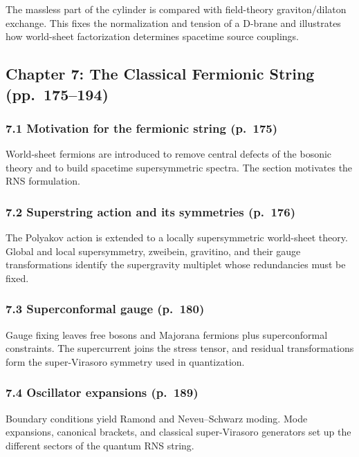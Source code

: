 \documentclass[
  10pt,
  a4paper,
  openany]{book}
\begin{document}
The massless part of the cylinder is compared with field-theory
graviton/dilaton exchange. This fixes the normalization and tension of a
D-brane and illustrates how world-sheet factorization determines
spacetime source couplings.

\subsection{Chapter 7: The Classical Fermionic String
(pp.~175--194)}\label{chapter-7-the-classical-fermionic-string-pp.-175194}

\subsubsection{7.1 Motivation for the fermionic string
(p.~175)}\label{motivation-for-the-fermionic-string-p.-175}

World-sheet fermions are introduced to remove central defects of the
bosonic theory and to build spacetime supersymmetric spectra. The
section motivates the RNS formulation.

\subsubsection{7.2 Superstring action and its symmetries
(p.~176)}\label{superstring-action-and-its-symmetries-p.-176}

The Polyakov action is extended to a locally supersymmetric world-sheet
theory. Global and local supersymmetry, zweibein, gravitino, and their
gauge transformations identify the supergravity multiplet whose
redundancies must be fixed.

\subsubsection{7.3 Superconformal gauge
(p.~180)}\label{superconformal-gauge-p.-180}

Gauge fixing leaves free bosons and Majorana fermions plus
superconformal constraints. The supercurrent joins the stress tensor,
and residual transformations form the super-Virasoro symmetry used in
quantization.

\subsubsection{7.4 Oscillator expansions
(p.~189)}\label{oscillator-expansions-p.-189}

Boundary conditions yield Ramond and Neveu--Schwarz moding. Mode
expansions, canonical brackets, and classical super-Virasoro generators
set up the different sectors of the quantum RNS string.
\end{document}
